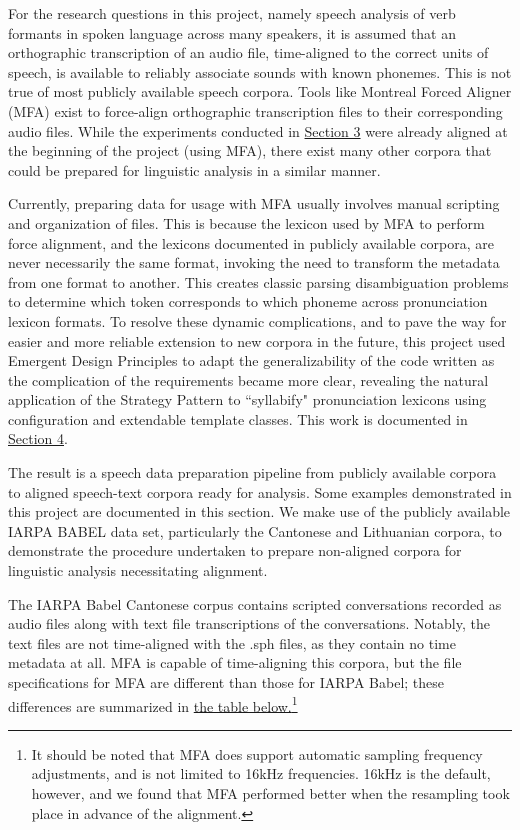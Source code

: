 \documentclass[11pt]{article}
\begin{document}
For the research questions in this project, namely speech analysis of verb formants in spoken language across many speakers, it is assumed that an orthographic transcription of an audio file, time-aligned to the correct units of speech, is available to reliably associate sounds with known phonemes. This is not true of most publicly available speech corpora. Tools like Montreal Forced Aligner (MFA)\cite{mcauliffe_montreal_nodate} exist to force-align orthographic transcription files to their corresponding audio files. While the experiments conducted in \hyperlink{section.3}{Section 3} were already aligned at the beginning of the project (using MFA), there exist many other corpora that could be prepared for linguistic analysis in a similar manner. 

Currently, preparing data for usage with MFA usually involves manual scripting and organization of files. This is because the lexicon used by MFA to perform force alignment, and the lexicons documented in publicly available corpora, are never necessarily the same format, invoking the need to transform the metadata from one format to another. This creates classic parsing disambiguation problems to determine which token corresponds to which phoneme across pronunciation lexicon formats. To resolve these dynamic complications, and to pave the way for easier and more reliable extension to new corpora in the future, this project used Emergent Design Principles\cite{bain_emergent_2008} to adapt the generalizability of the code written as the complication of the requirements became more clear, revealing the natural application of the Strategy Pattern\cite{freeman_head_2004} to ``syllabify" pronunciation lexicons using configuration and extendable template classes. This work is documented in \hyperlink{section.4}{Section 4}.

The result is a speech data preparation pipeline from publicly available corpora to aligned speech-text corpora ready for analysis. Some examples demonstrated in this project are documented in this section. We make use of the publicly available IARPA BABEL data set, particularly the Cantonese\cite{andrus_iarpa_2016} and Lithuanian\cite{benowitz_iarpa_2019} corpora, to demonstrate the procedure undertaken to prepare non-aligned corpora for linguistic analysis necessitating alignment.

The IARPA Babel Cantonese corpus contains scripted conversations recorded as audio files along with text file transcriptions of the conversations. Notably, the text files are not time-aligned with the .sph files, as they contain no time metadata at all. MFA is capable of time-aligning this corpora, but the file specifications for MFA are different than those for IARPA Babel; these differences are summarized in \hyperlink{table:corpus_format}{the table below.}\footnote{It should be noted that MFA does support automatic sampling frequency adjustments, and is not limited to 16kHz frequencies. 16kHz is the default, however, and we found that MFA performed better when the resampling took place in advance of the alignment.} 
\end{document}
